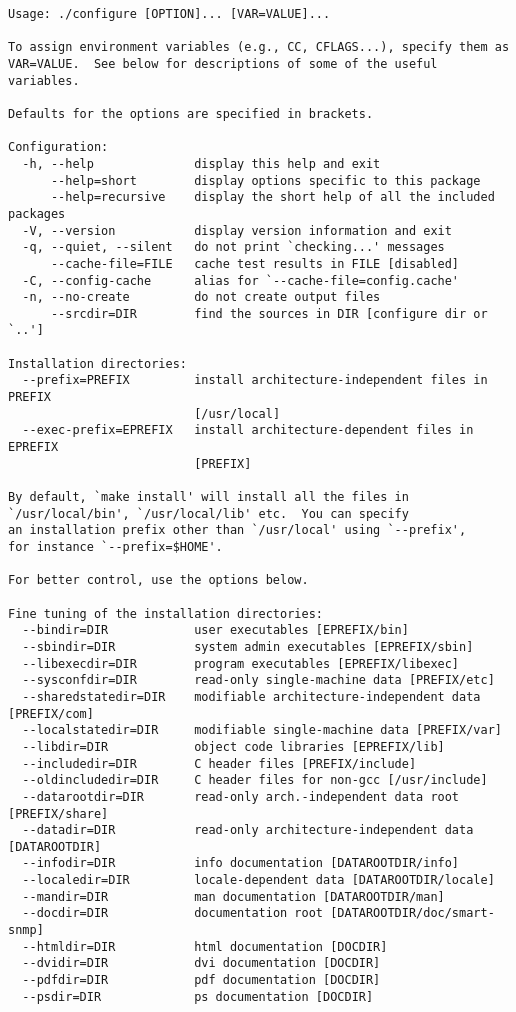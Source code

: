 \begin{verbatim}
Usage: ./configure [OPTION]... [VAR=VALUE]...

To assign environment variables (e.g., CC, CFLAGS...), specify them as
VAR=VALUE.  See below for descriptions of some of the useful variables.

Defaults for the options are specified in brackets.

Configuration:
  -h, --help              display this help and exit
      --help=short        display options specific to this package
      --help=recursive    display the short help of all the included packages
  -V, --version           display version information and exit
  -q, --quiet, --silent   do not print `checking...' messages
      --cache-file=FILE   cache test results in FILE [disabled]
  -C, --config-cache      alias for `--cache-file=config.cache'
  -n, --no-create         do not create output files
      --srcdir=DIR        find the sources in DIR [configure dir or `..']

Installation directories:
  --prefix=PREFIX         install architecture-independent files in PREFIX
                          [/usr/local]
  --exec-prefix=EPREFIX   install architecture-dependent files in EPREFIX
                          [PREFIX]

By default, `make install' will install all the files in
`/usr/local/bin', `/usr/local/lib' etc.  You can specify
an installation prefix other than `/usr/local' using `--prefix',
for instance `--prefix=$HOME'.

For better control, use the options below.

Fine tuning of the installation directories:
  --bindir=DIR            user executables [EPREFIX/bin]
  --sbindir=DIR           system admin executables [EPREFIX/sbin]
  --libexecdir=DIR        program executables [EPREFIX/libexec]
  --sysconfdir=DIR        read-only single-machine data [PREFIX/etc]
  --sharedstatedir=DIR    modifiable architecture-independent data [PREFIX/com]
  --localstatedir=DIR     modifiable single-machine data [PREFIX/var]
  --libdir=DIR            object code libraries [EPREFIX/lib]
  --includedir=DIR        C header files [PREFIX/include]
  --oldincludedir=DIR     C header files for non-gcc [/usr/include]
  --datarootdir=DIR       read-only arch.-independent data root [PREFIX/share]
  --datadir=DIR           read-only architecture-independent data [DATAROOTDIR]
  --infodir=DIR           info documentation [DATAROOTDIR/info]
  --localedir=DIR         locale-dependent data [DATAROOTDIR/locale]
  --mandir=DIR            man documentation [DATAROOTDIR/man]
  --docdir=DIR            documentation root [DATAROOTDIR/doc/smart-snmp]
  --htmldir=DIR           html documentation [DOCDIR]
  --dvidir=DIR            dvi documentation [DOCDIR]
  --pdfdir=DIR            pdf documentation [DOCDIR]
  --psdir=DIR             ps documentation [DOCDIR]


\end{verbatim}
